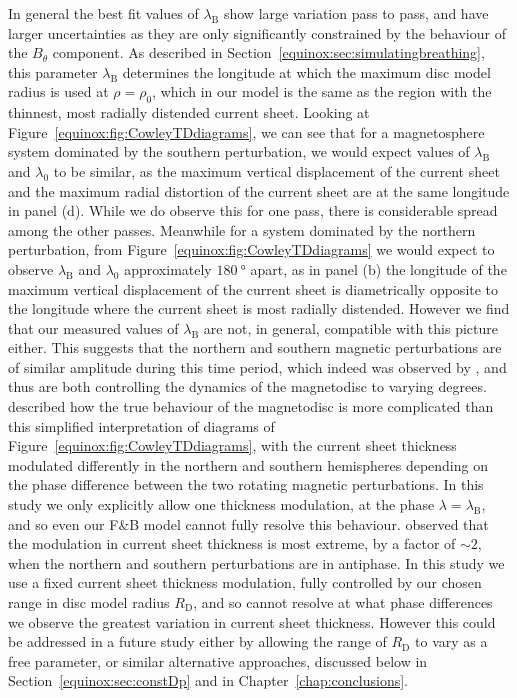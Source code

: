In general the best fit values of $\lambda_\mathrm{B}$ show large variation pass to pass, and have larger uncertainties as they are only significantly constrained by the behaviour of the $B_{\theta}$ component. As described in Section~\ref{equinox:sec:simulatingbreathing}, this parameter $\lambda_\mathrm{B}$ determines the longitude at which the maximum disc model radius is used at $\rho = \rho_0$, which in our model is the same as the region with the thinnest, most radially distended current sheet. Looking at Figure~\ref{equinox:fig:CowleyTDdiagrams}, we can see that for a magnetosphere system dominated by the southern perturbation, we would expect values of $\lambda_\mathrm{B}$ and $\lambda_\mathrm{0}$ to be similar, as the maximum vertical displacement of the current sheet and the maximum radial distortion of the current sheet are at the same longitude in panel (d). While we do observe this for one pass, there is considerable spread among the other passes. Meanwhile for a system dominated by the northern perturbation, from Figure~\ref{equinox:fig:CowleyTDdiagrams} we would expect to observe $\lambda_\mathrm{B}$ and $\lambda_\mathrm{0}$ approximately $\SI{180}{\degree}$ apart, as in panel (b) the longitude of the maximum vertical displacement of the current sheet is diametrically opposite to the longitude where the current sheet is most radially distended. However we find that our measured values of $\lambda_\mathrm{B}$ are not, in general, compatible with this picture either. This suggests that the northern and southern magnetic perturbations are of similar amplitude during this time period, which indeed was observed by \citet{andrews2012}, and thus are both controlling the dynamics of the magnetodisc to varying degrees. \citet{cowley2017b} described how the true behaviour of the magnetodisc is more complicated than this simplified interpretation of diagrams of Figure~\ref{equinox:fig:CowleyTDdiagrams}, with the current sheet thickness modulated differently in the northern and southern hemispheres depending on the phase difference between the two rotating magnetic perturbations. In this study we only explicitly allow one thickness modulation, at the phase $\lambda = \lambda_\mathrm{B}$, and so even our F{\&}B model cannot fully resolve this behaviour. \citep{provan2012} observed that the modulation in current sheet thickness is most extreme, by a factor of ${\sim}2$, when the northern and southern perturbations are in antiphase. In this study we use a fixed current sheet thickness modulation, fully controlled by our chosen range in disc model radius $R_\mathrm{D}$, and so cannot resolve at what phase differences we observe the greatest variation in current sheet thickness. However this could be addressed in a future study either by allowing the range of $R_\mathrm{D}$ to vary as a free parameter, or similar alternative approaches, discussed below in Section~\ref{equinox:sec:constDp} and in Chapter~\ref{chap:conclusions}.

